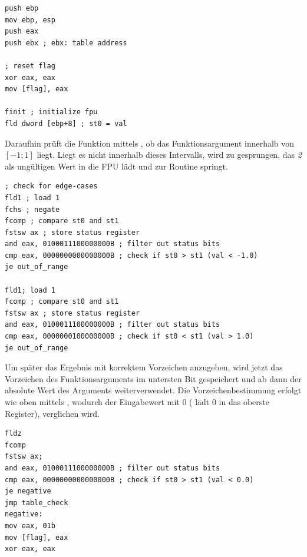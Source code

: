 \documentclass{article}
\begin{document}
\vspace{0.5cm}

\begin{lstlisting}
push ebp
mov ebp, esp
push eax
push ebx ; ebx: table address

; reset flag
xor eax, eax
mov [flag], eax

finit ; initialize fpu
fld dword [ebp+8] ; st0 = val
\end{lstlisting}

\vspace{0.5cm}

	Daraufhin prüft die Funktion mittels , ob das 
	Funktionsargument innerhalb
	von \([-1;1]\) liegt. Liegt es nicht innerhalb dieses Intervalls, wird
	zu  gesprungen, das \emph{2} als ungültigen Wert
	 in die FPU lädt und zur Routine springt.

\vspace{0.5cm}

\begin{lstlisting}
; check for edge-cases
fld1 ; load 1
fchs ; negate
fcomp ; compare st0 and st1
fstsw ax ; store status register
and eax, 0100011100000000B ; filter out status bits
cmp eax, 0000000000000000B ; check if st0 > st1 (val < -1.0)
je out_of_range

fld1; load 1
fcomp ; compare st0 and st1
fstsw ax ; store status register
and eax, 0100011100000000B ; filter out status bits
cmp eax, 0000000100000000B ; check if st0 < st1 (val > 1.0)
je out_of_range
\end{lstlisting}

\vspace{0.5cm}

	Um später das Ergebnis mit korrektem Vorzeichen anzugeben,
	wird jetzt das Vorzeichen des Funktionsarguments im untersten
	Bit gespeichert und ab dann der absolute Wert des Arguments
	weiterverwendet.
	Die Vorzeichenbestimmung erfolgt wie oben mittels ,
	wodurch der Eingabewert mit 0 ( lädt 0 in das oberste Register),
	verglichen wird.

\vspace{0.5cm}

\begin{lstlisting}
fldz
fcomp
fstsw ax;
and eax, 0100011100000000B ; filter out status bits
cmp eax, 0000000000000000B ; check if st0 > st1 (val < 0.0)
je negative
jmp table_check
negative:
mov eax, 01b
mov [flag], eax
xor eax, eax
\end{lstlisting}
\end{document}
